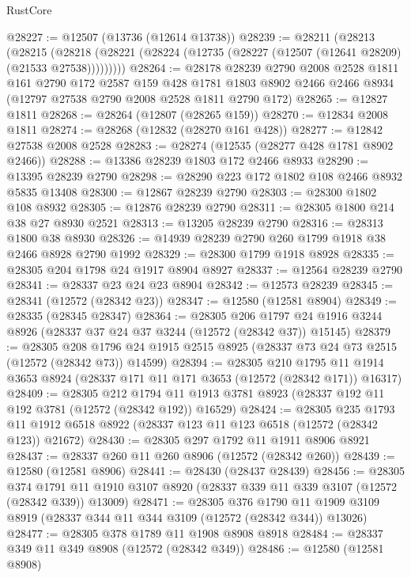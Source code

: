 \begin{lexlean}{RustCore}
\begin{coremodule}
@28227 := @12507 (@13736 (@12614 @13738))
@28239 := @28211
    (@28213
      (@28215
        (@28218 (@28221 (@28224 (@12735 (@28227 (@12507 (@12641 @28209) (@21533 @27538)))))))))
@28264 := @28178
    @28239
    @2790
    @2008
    @2528
    @1811
    @161
    @2790
    @172
    @2587
    @159
    @428
    @1781
    @1803
    @8902
    @2466
    @2466
    @8934
    (@12797 @27538 @2790 @2008 @2528 @1811 @2790 @172)
@28265 := @12827 @1811
@28268 := @28264 (@12807 (@28265 @159))
@28270 := @12834 @2008 @1811
@28274 := @28268 (@12832 (@28270 @161 @428))
@28277 := @12842 @27538 @2008 @2528
@28283 := @28274 (@12535 (@28277 @428 @1781 @8902 @2466))
@28288 := @13386 @28239 @1803 @172 @2466 @8933
@28290 := @13395 @28239 @2790
@28298 := @28290 @223 @172 @1802 @108 @2466 @8932 @5835 @13408
@28300 := @12867 @28239 @2790
@28303 := @28300 @1802 @108 @8932
@28305 := @12876 @28239 @2790
@28311 := @28305 @1800 @214 @38 @27 @8930 @2521
@28313 := @13205 @28239 @2790
@28316 := @28313 @1800 @38 @8930
@28326 := @14939 @28239 @2790 @260 @1799 @1918 @38 @2466 @8928 @2790 @1992
@28329 := @28300 @1799 @1918 @8928
@28335 := @28305 @204 @1798 @24 @1917 @8904 @8927
@28337 := @12564 @28239 @2790
@28341 := @28337 @23 @24 @23 @8904
@28342 := @12573 @28239
@28345 := @28341 (@12572 (@28342 @23))
@28347 := @12580 (@12581 @8904)
@28349 := @28335 (@28345 @28347)
@28364 := @28305
    @206
    @1797
    @24
    @1916
    @3244
    @8926
    (@28337 @37 @24 @37 @3244 (@12572 (@28342 @37)) @15145)
@28379 := @28305
    @208
    @1796
    @24
    @1915
    @2515
    @8925
    (@28337 @73 @24 @73 @2515 (@12572 (@28342 @73)) @14599)
@28394 := @28305
    @210
    @1795
    @11
    @1914
    @3653
    @8924
    (@28337 @171 @11 @171 @3653 (@12572 (@28342 @171)) @16317)
@28409 := @28305
    @212
    @1794
    @11
    @1913
    @3781
    @8923
    (@28337 @192 @11 @192 @3781 (@12572 (@28342 @192)) @16529)
@28424 := @28305
    @235
    @1793
    @11
    @1912
    @6518
    @8922
    (@28337 @123 @11 @123 @6518 (@12572 (@28342 @123)) @21672)
@28430 := @28305 @297 @1792 @11 @1911 @8906 @8921
@28437 := @28337 @260 @11 @260 @8906 (@12572 (@28342 @260))
@28439 := @12580 (@12581 @8906)
@28441 := @28430 (@28437 @28439)
@28456 := @28305
    @374
    @1791
    @11
    @1910
    @3107
    @8920
    (@28337 @339 @11 @339 @3107 (@12572 (@28342 @339)) @13009)
@28471 := @28305
    @376
    @1790
    @11
    @1909
    @3109
    @8919
    (@28337 @344 @11 @344 @3109 (@12572 (@28342 @344)) @13026)
@28477 := @28305 @378 @1789 @11 @1908 @8908 @8918
@28484 := @28337 @349 @11 @349 @8908 (@12572 (@28342 @349))
@28486 := @12580 (@12581 @8908)

\end{coremodule}
\end{lexlean}
